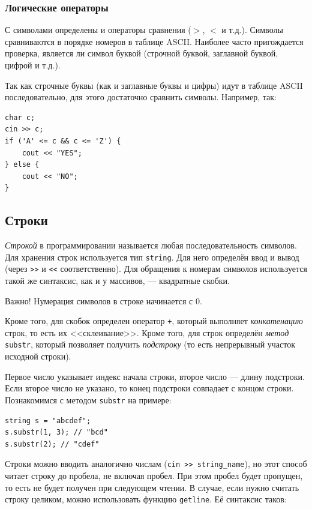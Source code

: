 \documentclass{article}
\newcommand{\important}[1]{
	\begin{sectionenv}[red!30!white]{Важно!}
		#1
	\end{sectionenv}
}
\begin{document}
	\subsubsection{Логические операторы}
	
	С символами определены и операторы сравнения ($>$, $<$ и т.д.). Символы сравниваются в порядке номеров в таблице ASCII. Наиболее часто пригождается проверка, является ли символ буквой (строчной буквой, заглавной буквой, цифрой и т.д.).
	
	Так как строчные буквы (как и заглавные буквы и цифры) идут в таблице ASCII последовательно, для этого достаточно сравнить символы. Например, так:
	
	\begin{lstlisting}
char c;
cin >> c;
if ('A' <= c && c <= 'Z') {
	cout << "YES";
} else {
	cout << "NO";
}
	\end{lstlisting}

	\subsection{Строки}

	\textit{Строкой} в программировании называется любая последовательность символов. Для хранения строк используется тип \texttt{string}. Для него определён ввод и вывод (через \texttt{>{}>} и \texttt{<{}<} соответственно). Для обращения к номерам символов используется такой же синтаксис, как и у массивов, --- квадратные скобки.

	\important{Нумерация символов в строке начинается с $0$.}

	Кроме того, для скобок определен оператор \texttt{+}, который выполняет \textit{конкатенацию} строк, то есть их <<склеивание>>. Кроме того, для строк определён \textit{метод} \texttt{substr}, который позволяет получить \textit{подстроку} (то есть непрерывный участок исходной строки). 
	
	Первое число указывает индекс начала строки, второе число --- длину подстроки. Если второе число не указано, то конец подстроки совпадает с концом строки. Познакомимся с методом \texttt{substr} на примере:

	\begin{lstlisting}
string s = "abcdef";
s.substr(1, 3); // "bcd"
s.substr(2); // "cdef"
	\end{lstlisting}
	
	Строки можно вводить аналогично числам (\texttt{cin >> string\_name}), но этот способ читает строку до пробела, не включая пробел. При этом пробел будет пропущен, то есть не будет получен при следующем чтении. В случае, если нужно считать строку целиком, можно использовать функцию \texttt{getline}. Её синтаксис таков:
	
\end{document}
